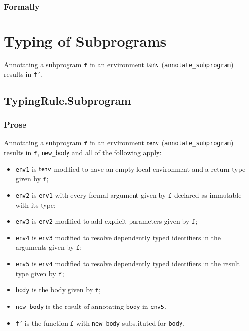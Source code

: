 \documentclass{book}
\newcommand\annotaterel[0]{\hyperlink{def-annotaterel}{\textsf{type}}}
\newcommand\typearrow[0]{\xrightarrow{\annotaterel}}
\newcommand\findsubprogram[0]{\hyperlink{def-findsubprogram}{\texttt{find\_subprogram}}}
\newcommand\vf[0]{\texttt{f}}
\newcommand\nameone[0]{\texttt{name1}}
\newcommand\name[0]{\texttt{name}}
\begin{document}
\begin{emptyformal}
\subsection{Formally}
\end{emptyformal}

\chapter{Typing of Subprograms}

Annotating a subprogram $\vf$ in an environment $\textsf{tenv}$
(\texttt{annotate\_subprogram}) results in \texttt{f'}.

\section{TypingRule.Subprogram \label{sec:TypingRule.Subprogram}}

  \subsection{Prose}
Annotating a subprogram $\vf$ in an environment $\textsf{tenv}$
(\texttt{annotate\_subprogram}) results in $\vf$, \texttt{new\_body} and all of
the following apply:
 \begin{itemize}
   \item \texttt{env1} is $\textsf{tenv}$ modified to have an empty local
     environment and a return type given by $\vf$;
   \item \texttt{env2} is \texttt{env1} with every formal argument given by
     $\vf$ declared as immutable with its type;
   \item \texttt{env3} is \texttt{env2} modified to add explicit parameters
     given by $\vf$;
   \item \texttt{env4} is \texttt{env3} modified to resolve dependently typed
     identifiers in the arguments given by $\vf$;
   \item \texttt{env5} is \texttt{env4} modified to resolve dependently typed
     identifiers in the result type given by $\vf$;
   \item \texttt{body} is the body given by $\vf$;
   \item \texttt{new\_body} is the result of annotating \texttt{body} in
     \texttt{env5}.
   \item \texttt{f'} is the function $\vf$ with \texttt{new\_body} substituted for \texttt{body}.
 \end{itemize}
\end{document}
